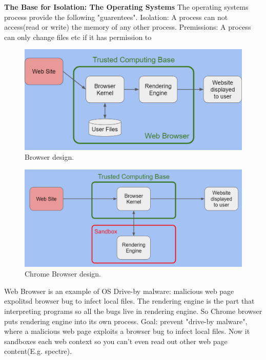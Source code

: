 \documentclass[11 pt]{scrartcl}
\begin{document}
\textbf{The Base for Isolation: The Operating Systems}\newline
The operating systems process provide the following "guarentees".
\itemnum
    \ii Isolation: A process can not access(read or write) the memory of any other process.
    \ii Premissions: A process can only change files etc if it has permission to 
\itemend
\begin{figure}[!htb]
    \centering
    \includegraphics[scale=0.5]{assets/browser_design.png}
    \caption{Browser design.}
\end{figure}
\begin{figure}[!htb]
    \centering
    \includegraphics[scale=0.5]{assets/chrome_browser.png}
    \caption{Chrome Browser design.}
\end{figure}
\begin{example}
    Web Browser is an example of OS\newline
    Drive-by malware: malicious web page expolitsd browser bug to infect local files. \newline 
    The rendering engine is the part that interpreting programs so all the bugs live in rendering engine. So Chrome browser puts rendering engine into its own process. Goal: prevent "drive-by malware", where a malicious web page exploits a browser bug to infect local files. Now it sandboxes each web context so you can't even read out other web page content(E.g. spectre).
\end{example}
\end{document}
